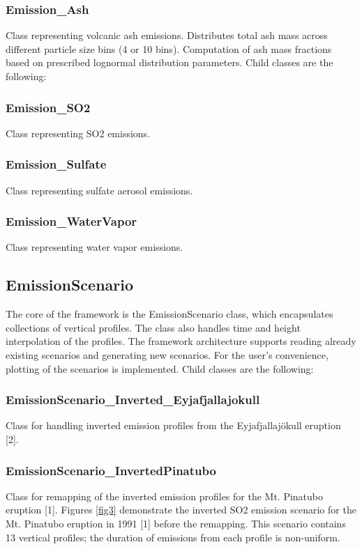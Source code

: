\documentclass{article}
\begin{document}
\subsubsection{Emission\_Ash}
Class representing volcanic ash emissions. Distributes total ash mass across different particle size bins (4 or 10 bins). Computation of ash mass fractions based on prescribed lognormal distribution parameters. Child classes are the following:

\subsubsection{Emission\_SO2}
Class representing SO2 emissions.

\subsubsection{Emission\_Sulfate}
Class representing sulfate aerosol emissions.

\subsubsection{Emission\_WaterVapor}
Class representing water vapor emissions.

\subsection{EmissionScenario}
The core of the framework is the EmissionScenario class, which encapsulates collections of vertical profiles. The class also handles time and height interpolation of the profiles. The framework architecture supports reading already existing scenarios and generating new scenarios. For the user's convenience, plotting of the scenarios is implemented. Child classes are the following:

\subsubsection{EmissionScenario\_Inverted\_Eyjafjallajokull}
Class for handling inverted emission profiles from the Eyjafjallajökull eruption [2].

\subsubsection{EmissionScenario\_InvertedPinatubo}
Class for remapping of the inverted emission profiles for the Mt. Pinatubo eruption [1]. Figures \ref{fig3} demonstrate the inverted SO2 emission scenario for the Mt. Pinatubo eruption in 1991 [1] before the remapping. This scenario contains 13 vertical profiles; the duration of emissions from each profile is non-uniform. 
\end{document}
